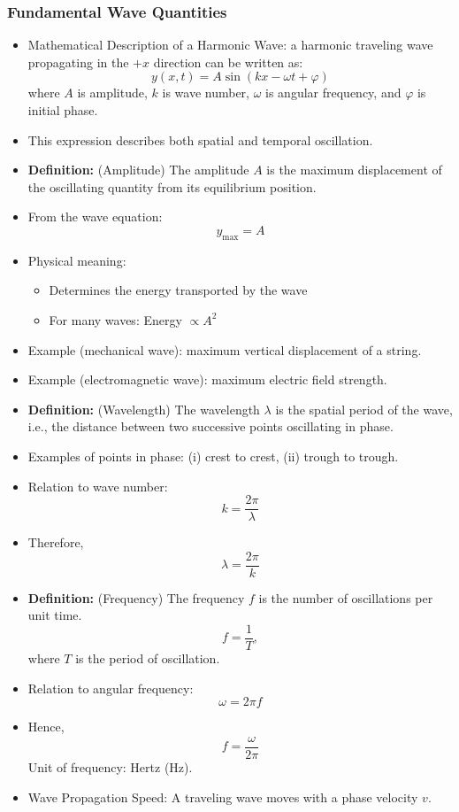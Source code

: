 \documentclass[t,aspectratio=169]{beamer}
\begin{document}
\begin{frame}
\frametitle{Fundamental Wave Quantities}
\begin{itemize}
\item Mathematical Description of a Harmonic Wave: a harmonic traveling wave propagating in the $+x$ direction can be written as:
$$ y\left(x,t\right) = A \sin\left(kx - \omega t + \varphi\right) $$
where $A$ is amplitude, $k$ is wave number, $\omega$ is angular frequency, and $\varphi$ is initial phase.
\item This expression describes both spatial and temporal oscillation.
\item \textbf{Definition:} (Amplitude) The amplitude $A$ is the maximum displacement of the oscillating quantity from its equilibrium position.
\item From the wave equation:
  $$ y_{\text{max}} = A $$

\pagebreak
\item Physical meaning:
\begin{itemize}
    \item Determines the energy transported by the wave
    \item For many waves: Energy $\propto A^2$
\end{itemize}
\item Example (mechanical wave): maximum vertical displacement of a string.  
\item Example (electromagnetic wave): maximum electric field strength.
\item \textbf{Definition:} (Wavelength) The wavelength $\lambda$ is the spatial period of the wave, i.e., the distance between two successive points oscillating in phase.
\item Examples of points in phase: (i) crest to crest, (ii) trough to trough.
\item Relation to wave number:
  $$ k = \frac{2\pi}{\lambda}$$
\item Therefore, 
$$ \lambda = \frac{2\pi}{k} $$

\pagebreak
\item \textbf{Definition:} (Frequency) The frequency $f$ is the number of oscillations per unit time.
$$ f = \frac{1}{T}, $$
where $T$ is the period of oscillation.
\item Relation to angular frequency:
$$ \omega = 2\pi f$$
\item Hence, 
$$ f = \frac{\omega}{2\pi} $$
Unit of frequency: Hertz (Hz).
\item Wave Propagation Speed: A traveling wave moves with a phase velocity $v$.


\end{itemize}
\end{frame}
\end{document}
